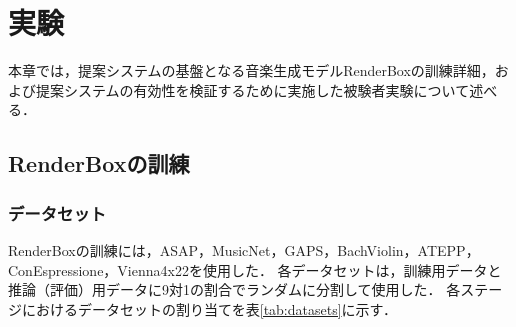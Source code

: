 \chapter{実験}
\label{chap:実験}

本章では，提案システムの基盤となる音楽生成モデルRenderBoxの訓練詳細，および提案システムの有効性を検証するために実施した被験者実験について述べる．

\section{RenderBoxの訓練}
\label{sec:RenderBoxの訓練}

\subsection{データセット}
RenderBoxの訓練には，ASAP\cite{asap-dataset}，MusicNet\cite{musicnet-dataset}，GAPS\cite{gaps-dataset}，BachViolin\cite{bach-violine-dataset}，ATEPP\cite{atepp-dataset}，ConEspressione\cite{conespressione-dataset}，Vienna4x22\cite{vienna4x22}を使用した．
各データセットは，訓練用データと推論（評価）用データに9対1の割合でランダムに分割して使用した．
各ステージにおけるデータセットの割り当てを表\ref{tab:datasets}に示す．

